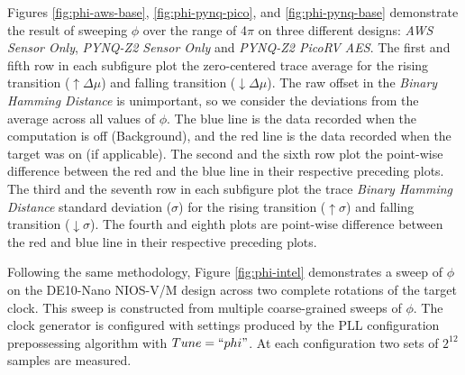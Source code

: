 Figures \ref{fig:phi-aws-base}, \ref{fig:phi-pynq-pico}, and \ref{fig:phi-pynq-base} demonstrate the result of sweeping $\phi$ over the range of 4$\pi$ on three different designs: \textit{AWS Sensor Only}, \textit{PYNQ-Z2 Sensor Only} and \textit{PYNQ-Z2 PicoRV AES}.
The first and fifth row in each subfigure plot the zero-centered trace average for the rising transition ($\uparrow\Delta\mu$) and falling transition ($\downarrow\Delta\mu$). 
The raw offset in the \textit{Binary Hamming Distance} is unimportant, so we consider the deviations from the average across all values of $\phi$.
The blue line is the data recorded when the computation is off (Background), and the red line is the data recorded when the target was on (if applicable). The second and the sixth row plot the point-wise difference between the red and the blue line in their respective preceding plots. The third and the seventh row in each subfigure plot the trace \textit{Binary Hamming Distance} standard deviation ($\sigma$) for the rising transition ($\uparrow\sigma$) and falling transition ($\downarrow\sigma$). The fourth and eighth plots are point-wise difference between the red and blue line in their respective preceding plots.

Following the same methodology, Figure \ref{fig:phi-intel} demonstrates a sweep of $\phi$ on the DE10-Nano NIOS-V/M design across two complete rotations of the target clock. This sweep is constructed from multiple coarse-grained sweeps of $\phi$. The clock generator is configured with settings produced by the PLL configuration prepossessing algorithm with $Tune=``phi"$. At each configuration two sets of $2^{12}$ samples are measured. 

%




